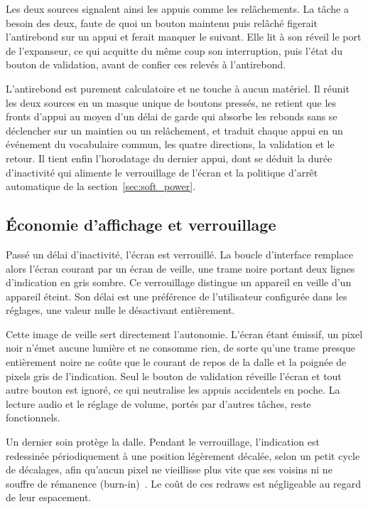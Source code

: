 Les deux sources signalent ainsi les appuis comme les relâchements. La tâche a besoin des deux, faute de quoi un bouton maintenu puis relâché figerait l'antirebond sur un appui et ferait manquer le suivant. Elle lit à son réveil le port de l'expanseur, ce qui acquitte du même coup son interruption, puis l'état du bouton de validation, avant de confier ces relevés à l'antirebond.

L'antirebond est purement calculatoire et ne touche à aucun matériel. Il réunit les deux sources en un masque unique de boutons pressés, ne retient que les fronts d'appui au moyen d'un délai de garde qui absorbe les rebonds sans se déclencher sur un maintien ou un relâchement, et traduit chaque appui en un événement du vocabulaire commun, les quatre directions, la validation et le retour. Il tient enfin l'horodatage du dernier appui, dont se déduit la durée d'inactivité qui alimente le verrouillage de l'écran et la politique d'arrêt automatique de la section~\ref{sec:soft_power}.

\subsection{Économie d'affichage et verrouillage}
\label{sec:ui_verrouillage}

Passé un délai d'inactivité, l'écran est verrouillé. La boucle d'interface remplace alors l'écran courant par un écran de veille, une trame noire portant deux lignes d'indication en gris sombre. Ce verrouillage distingue un appareil en veille d'un appareil éteint. Son délai est une préférence de l'utilisateur configurée dans les réglages, une valeur nulle le désactivant entièrement.

Cette image de veille sert directement l'autonomie. L'écran étant émissif, un pixel noir n'émet aucune lumière et ne consomme rien, de sorte qu'une trame presque entièrement noire ne coûte que le courant de repos de la dalle et la poignée de pixels gris de l'indication. Seul le bouton de validation réveille l'écran et tout autre bouton est ignoré, ce qui neutralise les appuis accidentels en poche. La lecture audio et le réglage de volume, portés par d'autres tâches, reste fonctionnels.

Un dernier soin protège la dalle. Pendant le verrouillage, l'indication est redessinée périodiquement à une position légèrement décalée, selon un petit cycle de décalages, afin qu'aucun pixel ne vieillisse plus vite que ses voisins ni ne souffre de rémanence (burn-in)~\cite{viewsonic_oled_burnin}. Le coût de ces redraws est négligeable au regard de leur espacement.